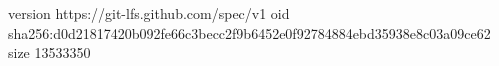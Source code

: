 version https://git-lfs.github.com/spec/v1
oid sha256:d0d21817420b092fe66c3becc2f9b6452e0f92784884ebd35938e8c03a09ce62
size 13533350
